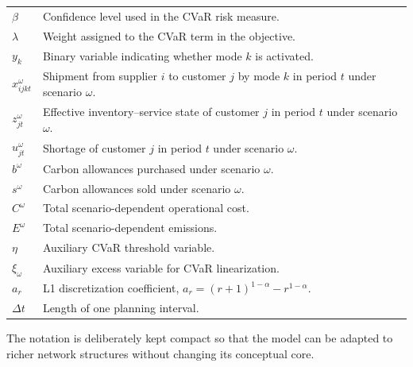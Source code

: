 \begin{longtable}{p{}p{}}
$\beta$ & Confidence level used in the CVaR risk measure.\\
$\lambda$ & Weight assigned to the CVaR term in the objective.\\
$y_k$ & Binary variable indicating whether mode $k$ is activated.\\
$x_{ijkt}^{\omega}$ & Shipment from supplier $i$ to customer $j$ by mode $k$ in period $t$ under scenario $\omega$.\\
$z_{jt}^{\omega}$ & Effective inventory--service state of customer $j$ in period $t$ under scenario $\omega$.\\
$u_{jt}^{\omega}$ & Shortage of customer $j$ in period $t$ under scenario $\omega$.\\
$b^{\omega}$ & Carbon allowances purchased under scenario $\omega$.\\
$s^{\omega}$ & Carbon allowances sold under scenario $\omega$.\\
$C^{\omega}$ & Total scenario-dependent operational cost.\\
$E^{\omega}$ & Total scenario-dependent emissions.\\
$\eta$ & Auxiliary CVaR threshold variable.\\
$\xi_{\omega}$ & Auxiliary excess variable for CVaR linearization.\\
$a_r$ & L1 discretization coefficient, $a_r=(r+1)^{1-\alpha}-r^{1-\alpha}$.\\
$\Delta t$ & Length of one planning interval.\\
\bottomrule
\end{longtable}

The notation is deliberately kept compact so that the model can be adapted to richer network structures without changing its conceptual core.